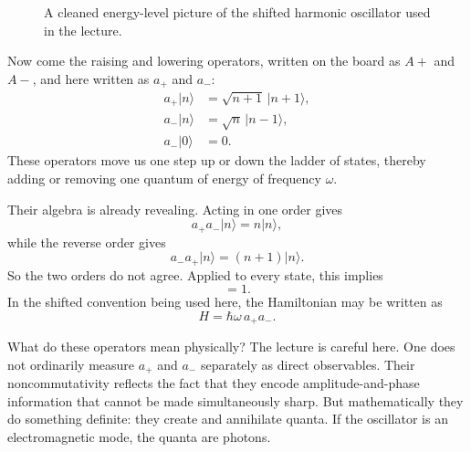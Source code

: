 \begin{figure}[t]
\centering
{}
\caption{A cleaned energy-level picture of the shifted harmonic oscillator used in the lecture.}
\end{figure}

Now come the raising and lowering operators, written on the board as \(A+\) and \(A-\), and here written as \(a_+\) and \(a_-\):
\begin{align}
a_+|n\rangle &= \sqrt{n+1}\,|n+1\rangle,\\
a_-|n\rangle &= \sqrt{n}\,|n-1\rangle,\\
a_-|0\rangle &= 0.
\end{align}
These operators move us one step up or down the ladder of states, thereby adding or removing one quantum of energy of frequency \(\omega\).

Their algebra is already revealing. Acting in one order gives
\begin{equation}
a_+a_-|n\rangle = n|n\rangle,
\end{equation}
while the reverse order gives
\begin{equation}
a_-a_+|n\rangle = (n+1)|n\rangle.
\end{equation}
So the two orders do not agree. Applied to every state, this implies
\begin{equation}
[a_-,a_+]=1.
\end{equation}
In the shifted convention being used here, the Hamiltonian may be written as
\begin{equation}
H=\hbar\omega\,a_+a_-.
\end{equation}

What do these operators mean physically? The lecture is careful here. One does not ordinarily measure \(a_+\) and \(a_-\) separately as direct observables. Their noncommutativity reflects the fact that they encode amplitude-and-phase information that cannot be made simultaneously sharp. But mathematically they do something definite: they create and annihilate quanta. If the oscillator is an electromagnetic mode, the quanta are photons.


